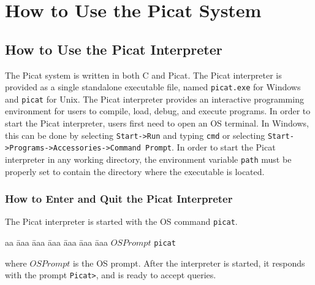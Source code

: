 \chapter{How to Use the Picat System}
\section{How to Use the Picat Interpreter}
The Picat system is written in both C and Picat. The Picat interpreter is provided as a single standalone executable file, named \texttt{picat.exe} for Windows and \texttt{picat} for Unix. The Picat interpreter provides an interactive programming environment for users to compile, load, debug, and execute programs. In order to start the Picat interpreter, users first need to open an OS terminal. In Windows, this can be done by selecting \verb+Start->Run+ and typing \verb+cmd+ or selecting \verb+Start->Programs->Accessories->Command Prompt+.  In order to start the Picat interpreter in any working directory, the environment variable \texttt{path} must be properly set to contain the directory where the executable is located.

\subsection{How to Enter and Quit the Picat Interpreter}
The Picat interpreter is started with the OS command \texttt{picat}. 
\begin{tabbing}
aa \= aaa \= aaa \= aaa \= aaa \= aaa \= aaa \kill
\> \> $OSPrompt$ \texttt{picat}
\end{tabbing}
where $OSPrompt$ is the OS prompt. After the interpreter is started, it responds with the prompt \verb+Picat>+, and is ready to accept queries. 

